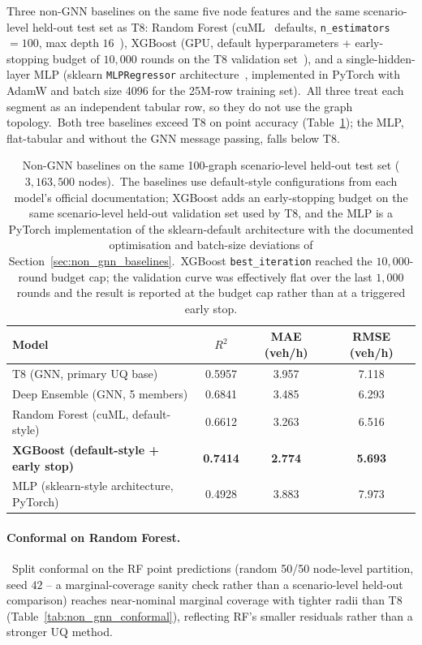Three non-GNN baselines on the same five node features and the same scenario-level held-out test set as T8: Random Forest (cuML~\cite{raschka2020rapids} defaults, \texttt{n\_estimators}~$=100$, max depth $16$~\cite{breiman2001randomforests}), XGBoost (GPU, default hyperparameters + early-stopping budget of $10{,}000$ rounds on the T8 validation set~\cite{chen2016xgboost}), and a single-hidden-layer MLP (sklearn \texttt{MLPRegressor} architecture~\cite{pedregosa2011scikit}, implemented in PyTorch with AdamW and batch size 4096 for the 25M-row training set).\ All three treat each segment as an independent tabular row, so they do not use the graph topology.\ Both tree baselines exceed T8 on point accuracy (Table~\ref{tab:non_gnn}); the MLP, flat-tabular and without the GNN message passing, falls below T8.

\begin{table}[htbp]
\centering
\caption[Non-GNN baselines vs T8]{Non-GNN baselines on the same 100-graph scenario-level held-out test set ($3{,}163{,}500$ nodes).\ The baselines use default-style configurations from each model's official documentation; XGBoost adds an early-stopping budget on the same scenario-level held-out validation set used by T8, and the MLP is a PyTorch implementation of the sklearn-default architecture with the documented optimisation and batch-size deviations of Section~\ref{sec:non_gnn_baselines}.\ XGBoost \texttt{best\_iteration} reached the $10{,}000$-round budget cap; the validation curve was effectively flat over the last $1{,}000$ rounds and the result is reported at the budget cap rather than at a triggered early stop.}
\label{tab:non_gnn}
\begin{tabular}{lccc}
\toprule
Model & $R^2$ & MAE (veh/h) & RMSE (veh/h) \\
\midrule
T8 (GNN, primary UQ base) & 0.5957 & 3.957 & 7.118 \\
Deep Ensemble (GNN, 5 members) & 0.6841 & 3.485 & 6.293 \\
\midrule
Random Forest (cuML, default-style) & 0.6612 & 3.263 & 6.516 \\
\textbf{XGBoost (default-style + early stop)} & \textbf{0.7414} & \textbf{2.774} & \textbf{5.693} \\
MLP (sklearn-style architecture, PyTorch) & 0.4928 & 3.883 & 7.973 \\
\bottomrule
\end{tabular}
\end{table}

\paragraph{Conformal on Random Forest.}\ Split conformal on the RF point predictions (random 50/50 node-level partition, seed $42$ -- a marginal-coverage sanity check rather than a scenario-level held-out comparison) reaches near-nominal marginal coverage with tighter radii than T8 (Table~\ref{tab:non_gnn_conformal}), reflecting RF's smaller residuals rather than a stronger UQ method.

